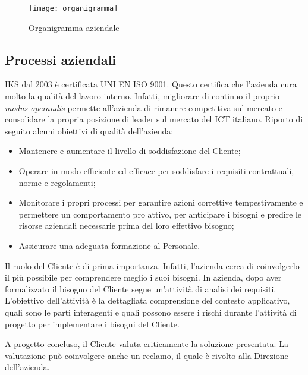 \begin{figure}[htbp]
	\begin{center}
		\texttt{[image: organigramma]}
		\caption{Organigramma aziendale}
	\end{center}
\end{figure}



\subsection{Processi aziendali}

IKS dal 2003 è certificata UNI EN ISO 9001. Questo certifica che 
l'azienda cura molto la qualità del lavoro interno. Infatti, migliorare di 
continuo il proprio \textit{modus operandis} permette all'azienda di rimanere 
competitiva sul mercato e consolidare la propria posizione di leader 
sul mercato del ICT italiano. Riporto di seguito alcuni obiettivi di
qualità dell'azienda:

\begin{itemize}
	\item Mantenere e aumentare il livello di soddisfazione del Cliente;
	\item Operare in modo efficiente ed efficace per soddisfare i requisiti 
		  contrattuali, norme e regolamenti;
	\item Monitorare i propri processi per garantire azioni correttive 
	      tempestivamente e permettere un comportamento pro attivo, per 
	      anticipare i bisogni e predire le risorse aziendali necessarie 
	      prima del loro effettivo bisogno; 
	\item Assicurare una adeguata formazione al Personale.
\end{itemize}


Il ruolo del Cliente è di prima importanza. Infatti, l'azienda cerca di 
coinvolgerlo il più possibile per comprendere meglio i suoi bisogni. 
In azienda, dopo aver formalizzato il bisogno del Cliente segue un'attività di 
analisi dei requisiti. L'obiettivo dell'attività è la dettagliata 
comprensione del contesto applicativo, quali sono le parti interagenti 
e quali possono essere i rischi durante l'attività di progetto per 
implementare i bisogni del Cliente.

A progetto concluso, il Cliente valuta criticamente la soluzione 
presentata. La valutazione può coinvolgere anche un reclamo, il quale 
è rivolto alla Direzione dell'azienda.

